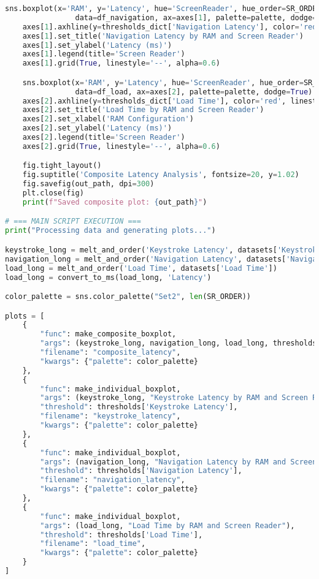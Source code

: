 \begin{lstlisting}[language=python]
    sns.boxplot(x='RAM', y='Latency', hue='ScreenReader', hue_order=SR_ORDER,
                data=df_navigation, ax=axes[1], palette=palette, dodge=True)
    axes[1].axhline(y=thresholds_dict['Navigation Latency'], color='red', linestyle='--')
    axes[1].set_title('Navigation Latency by RAM and Screen Reader')
    axes[1].set_ylabel('Latency (ms)')
    axes[1].legend(title='Screen Reader')
    axes[1].grid(True, linestyle='--', alpha=0.6)

    sns.boxplot(x='RAM', y='Latency', hue='ScreenReader', hue_order=SR_ORDER,
                data=df_load, ax=axes[2], palette=palette, dodge=True)
    axes[2].axhline(y=thresholds_dict['Load Time'], color='red', linestyle='--')
    axes[2].set_title('Load Time by RAM and Screen Reader')
    axes[2].set_xlabel('RAM Configuration')
    axes[2].set_ylabel('Latency (ms)')
    axes[2].legend(title='Screen Reader')
    axes[2].grid(True, linestyle='--', alpha=0.6)

    fig.tight_layout()
    fig.suptitle('Composite Latency Analysis', fontsize=20, y=1.02)
    fig.savefig(out_path, dpi=300)
    plt.close(fig)
    print(f"Saved composite plot: {out_path}")

# === MAIN SCRIPT EXECUTION ===
print("Processing data and generating plots...")

keystroke_long = melt_and_order('Keystroke Latency', datasets['Keystroke Response'])
navigation_long = melt_and_order('Navigation Latency', datasets['Navigation Commands'])
load_long = melt_and_order('Load Time', datasets['Load Time'])
load_long = convert_to_ms(load_long, 'Latency')

color_palette = sns.color_palette("Set2", len(SR_ORDER))

plots = [
    {
        "func": make_composite_boxplot,
        "args": (keystroke_long, navigation_long, load_long, thresholds),
        "filename": "composite_latency",
        "kwargs": {"palette": color_palette}
    },
    {
        "func": make_individual_boxplot,
        "args": (keystroke_long, "Keystroke Latency by RAM and Screen Reader"),
        "threshold": thresholds['Keystroke Latency'],
        "filename": "keystroke_latency",
        "kwargs": {"palette": color_palette}
    },
    {
        "func": make_individual_boxplot,
        "args": (navigation_long, "Navigation Latency by RAM and Screen Reader"),
        "threshold": thresholds['Navigation Latency'],
        "filename": "navigation_latency",
        "kwargs": {"palette": color_palette}
    },
    {
        "func": make_individual_boxplot,
        "args": (load_long, "Load Time by RAM and Screen Reader"),
        "threshold": thresholds['Load Time'],
        "filename": "load_time",
        "kwargs": {"palette": color_palette}
    }
]




\end{lstlisting}

